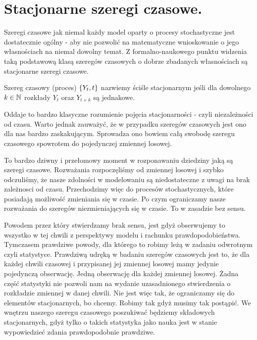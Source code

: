 \documentclass[10pt,a4paper]{book}
\begin{document}
\section{Stacjonarne szeregi czasowe.}

Szeregi czasowe jak niemal każdy model oparty o procesy stochastyczne jest dostatecznie ogólny - aby nie pozwolić na matematyczne wnioskowanie o jego własnościach na niemal dowolny temat. Z formalno-naukowego punktu widzenia taką podstawową klasą szeregów czasowych o dobrze zbadanych własnościach są stacjonarne szeregi czasowe.  

\begin{definition}
Szereg czasowy (proces) $\left\lbrace {{Y_t}, {t}} \right\rbrace$ nazwiemy ściśle stacjonarnym jeśli dla dowolnego $k \in \mathbb{N}$ rozkłady $Y_t$ oraz $Y_{t+k}$ są jednakowe.
\end{definition}

Oddaje to bardzo klasyczne rozumienie pojęcia stacjonarności - czyli niezależności od czasu. Warto jednak zauważyć, że w przypadku szeregów czasowych jest ono dla nas bardzo zaskakującym. Sprowadza ono bowiem całą swobodę szeregu czasowego spowrotem do pojedynczej zmiennej losowej. 

\begin{remark*}
To bardzo dziwny i przełomowy moment w rozponawaniu dziedziny jaką są szeregi czasowe. Rozważania rozpoczęliśmy od zmiennej losowej i szybko odczuliśmy, że nasze zdolności w modelowaniu są niedostateczne z uwagi na brak zależnosci od czasu. Przechodzimy więc do procesów stochastycznych, które posiadają możliwość zmieniania się w czasie. Po czym ograniczamy nasze rozważania do szeregów niezmieniających się w czasie. To w zasadzie bez sensu. 

Powodem przez który stwierdzamy brak sensu, jest gdyż obserwujemy to wszystko w tej chwili z perspektywy modelu i rachunku prawdopodobieństwa. Tymczasem prawdziwe powody, dla którego to robimy leżą w zadaniu odwrotnym czyli statystyce. Prawdziwą udręką w badaniu szeregów czasowych jest to, że dla każdej chwili czasowej i przypisanej jej zmiennej losowej mamy jedynie pojedynczą obserwację. Jedną obserwację dla każdej zmiennej losowej. Żadna część statystyki nie pozwoli nam na wydanie uzasadnionego stwierdzenia o rozkładzie zmiennej w danej chwili. Nie jest więc tak, że ograniczamy się do elementów stacjonarnych, bo chcemy. Robimy tak gdyż musimy tak postąpić. We wnętrzu naszego szeregu czasowego poszukiwać będziemy składowych stacjonarnych, gdyż tylko o takich statystyka jako nauka jest w stanie wypowiedzieć zdania prawdopodobnie prawdziwe.
\end{remark*}
\end{document}
